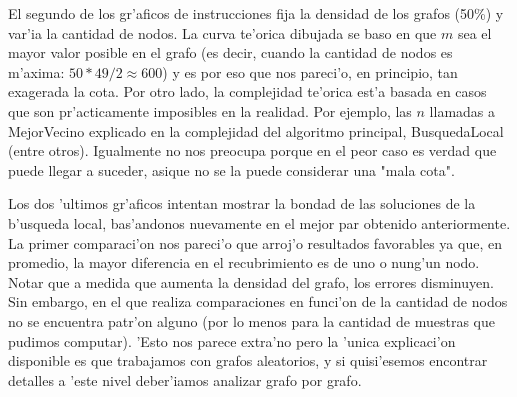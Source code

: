 El segundo de los gr'aficos de instrucciones fija la densidad de los grafos (50\%) y var'ia la cantidad de nodos. La curva te'orica dibujada se baso en que $m$ sea el mayor valor posible en el grafo (es decir, cuando la cantidad de nodos es m'axima: $50*49/2 \approx 600$) y es por eso que nos pareci'o, en principio, tan exagerada la cota. Por otro lado, la complejidad te'orica est'a basada en casos que son pr'acticamente imposibles en la realidad. Por ejemplo, las $n$ llamadas a MejorVecino explicado en la complejidad del algoritmo principal, BusquedaLocal (entre otros). Igualmente no nos preocupa porque en el peor caso es verdad que puede llegar a suceder, asique no se la puede considerar una "mala cota".

Los dos 'ultimos gr'aficos intentan mostrar la bondad de las soluciones de la b'usqueda local, bas'andonos nuevamente en el mejor par obtenido anteriormente. La primer comparaci'on nos pareci'o que arroj'o resultados favorables ya que, en promedio, la mayor diferencia en el recubrimiento es de uno o nung'un nodo. Notar que a medida que aumenta la densidad del grafo, los errores disminuyen. Sin embargo, en el que realiza comparaciones en funci'on de la cantidad de nodos no se encuentra patr'on alguno (por lo menos para la cantidad de muestras que pudimos computar). 'Esto nos parece extra'no pero la 'unica explicaci'on disponible es que trabajamos con grafos aleatorios, y si quisi'esemos encontrar detalles a 'este nivel deber'iamos analizar grafo por grafo.
